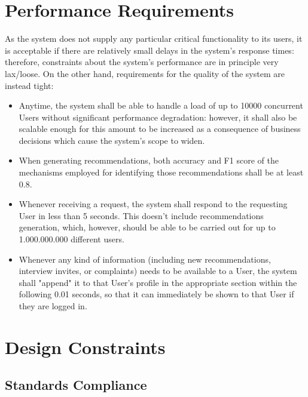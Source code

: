 
\section{Performance Requirements}
\label{sec:performance_requirements}

As the system does not supply any particular critical functionality to its users, it is acceptable if there are relatively small delays in the system's response times: therefore, constraints about the system's performance are in principle very lax/loose. On the other hand, requirements for the quality of the system are instead tight:

\begin{itemize}
    \item Anytime, the system shall be able to handle a load of up to 10000 concurrent Users without significant performance degradation: however, it shall also be scalable enough for this amount to be increased as a consequence of business decisions which cause the system's scope to widen.
    \item When generating recommendations, both accuracy and F1 score of the mechanisms employed for identifying those recommendations shall be at least 0.8. 
    \item Whenever receiving a request, the system shall respond to the requesting User in less than 5 seconds. This doesn't include recommendations generation, which, however, should be able to be carried out for up to 1.000.000.000 different users.
    \item Whenever any kind of information (including new recommendations, interview invites, or complaints) needs to be available to a User, the system shall "append" it to that User's profile in the appropriate section within the following 0.01 seconds, so that it can immediately be shown to that User if they are logged in.
\end{itemize}

\section{Design Constraints}
\label{sec:design_constraints}%

\subsection{Standards Compliance}
\label{sec:standards_compliance}%

